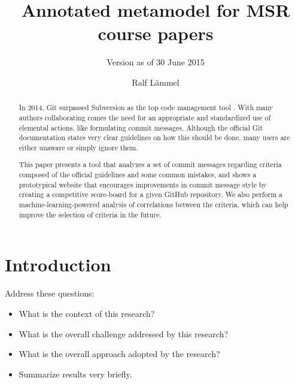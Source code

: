 \documentclass{llncs}
\begin{document}
\title{Annotated metamodel for MSR course papers}

\subtitle{Version as of 30 June 2015}

\author{Ralf L\"ammel}


\maketitle

\begin{abstract}
  In 2014, Git surpassed Subversion as the top code management tool
  \cite{EComSurv14}. With many authors collaborating comes the need for an
  appropriate and standardized use of elemental actions, like formulating
  commit messages. Although the official Git documentation states very clear
  guidelines \cite{OffGuide} on how this should be done, many users are either
  unaware or simply ignore them.

  This paper presents a tool that analyzes a set of commit messages regarding
  criteria composed of the official guidelines and some common mistakes, and
  shows a prototypical website that encourages improvements in commit message
  style by creating a competitive score-board for a given GitHub repository. We
  also perform a machine-learning-powered analysis of correlations between the
  criteria, which can help improve the selection of criteria in the future.
\end{abstract}


\section{Introduction}

Address these questions:

\begin{itemize}

\item What is the context of this research?

\item What is the overall challenge addressed by this research?

\item What is the overall approach adopted by the research?

\item Summarize results very briefly.

\end{itemize}
\end{document}
